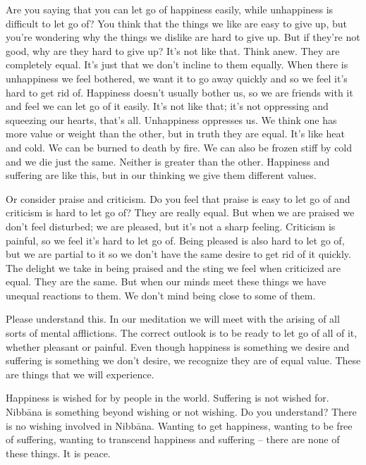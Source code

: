 Are you saying that you can let go of happiness easily, while unhappiness is difficult to let go of? You think that the things we like are easy to give up, but you're wondering why the things we dislike are hard to give up. But if they're not good, why are they hard to give up? It's not like that. Think anew. They are completely equal. It's just that we don't incline to them equally. When there is unhappiness we feel bothered, we want it to go away quickly and so we feel it's hard to get rid of. Happiness doesn't usually bother us, so we are friends with it and feel we can let go of it easily. It's not like that; it's not oppressing and squeezing our hearts, that's all. Unhappiness oppresses us. We think one has more value or weight than the other, but in truth they are equal. It's like heat and cold. We can be burned to death by fire. We can also be frozen stiff by cold and we die just the same. Neither is greater than the other. Happiness and suffering are like this, but in our thinking we give them different values. 

Or consider praise and criticism. Do you feel that praise is easy to let go of and criticism is hard to let go of? They are really equal. But when we are praised we don't feel disturbed; we are pleased, but it's not a sharp feeling. Criticism is painful, so we feel it's hard to let go of. Being pleased is also hard to let go of, but we are partial to it so we don't have the same desire to get rid of it quickly. The delight we take in being praised and the sting we feel when criticized are equal. They are the same. But when our minds meet these things we have unequal reactions to them. We don't mind being close to some of them. 

Please understand this. In our meditation we will meet with the arising of all sorts of mental afflictions. The correct outlook is to be ready to let go of all of it, whether pleasant or painful. Even though happiness is something we desire and suffering is something we don't desire, we recognize they are of equal value. These are things that we will experience. 

Happiness is wished for by people in the world. Suffering is not wished for. Nibb\=ana is something beyond wishing or not wishing. Do you understand? There is no wishing involved in Nibb\=ana. Wanting to get happiness, wanting to be free of suffering, wanting to transcend happiness and suffering -- there are none of these things. It is peace. 

